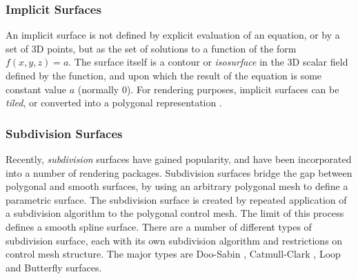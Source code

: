\subsubsection{\label{sec:litreview:surfaces:smooth:implicit}Implicit Surfaces}

An implicit surface is not defined by explicit evaluation of an equation, or by a set of 3D points, but as the set of solutions to a function of the form $f(x,y,z) = a$. The surface itself is a contour or {\it isosurface} in the 3D scalar field defined by the function, and upon which the result of the equation is some constant value $a$ (normally 0). For rendering purposes, implicit surfaces can be {\it tiled}, or converted into a polygonal representation \cite{Ning93}.

\subsubsection{\label{sec:litreview:surfaces:smooth:subdivision}Subdivision Surfaces}
Recently, {\it subdivision} surfaces have gained popularity, and have been incorporated into a number of rendering packages. Subdivision surfaces bridge the gap between polygonal and smooth surfaces, by using an arbitrary polygonal mesh to define a parametric surface. The subdivision surface is created by repeated application of a subdivision algorithm to the polygonal control mesh. The limit of this process defines a smooth spline surface. There are a number of different types of subdivision surface, each with its own subdivision algorithm and restrictions on control mesh structure. The major types are Doo-Sabin \cite{Doo78}, Catmull-Clark \cite{Catmull78}, Loop \cite{Loop94} and Butterfly \cite{Dyn90} surfaces. 

